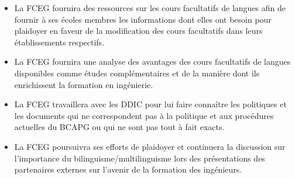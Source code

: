\begin{itemize}
 \item La FCEG fournira des ressources sur les cours facultatifs de langues afin de fournir à ses écoles membres les informations dont elles ont besoin pour plaidoyer en faveur de la modification des cours facultatifs dans leurs établissements respectifs.
 \item La FCEG fournira une analyse des avantages des cours facultatifs de langues disponibles comme études complémentaires et de la manière dont ils enrichissent la formation en ingénierie.
 \item La FCEG travaillera avec les DDIC pour lui faire connaître les politiques et les documents qui ne correspondent pas à la politique et aux procédures actuelles du BCAPG ou qui ne sont pas tout à fait exacts.
 \item La FCEG poursuivra ses efforts de plaidoyer et continuera la discussion sur l'importance du bilinguisme/multilinguisme lors des présentations des partenaires externes sur l'avenir de la formation des ingénieurs.
\end{itemize}

\newpage
